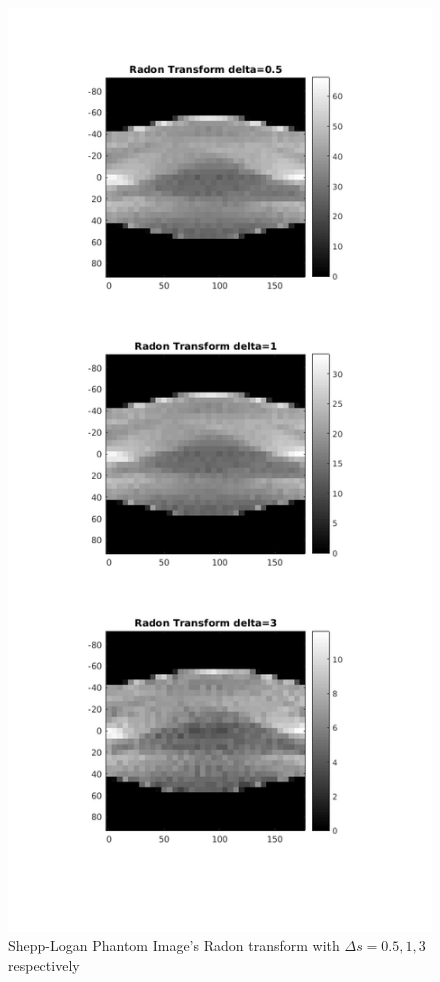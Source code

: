 \documentclass[11pt]{article}
\begin{document}
\begin{figure}[h]
\centering
\includegraphics[scale=0.5]{c}
\caption{Shepp-Logan Phantom Image's Radon transform with $\Delta s = 0.5,1,3$ respectively}
\end{figure}
\end{document}
